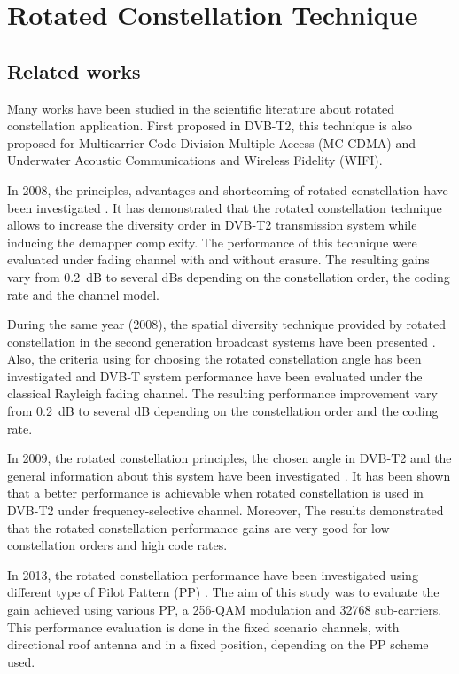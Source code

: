 
\section{Rotated Constellation Technique}

\subsection{Related works}
Many works have been studied in the scientific literature about rotated constellation application. First proposed in DVB-T2, this technique is also proposed for Multicarrier-Code Division Multiple Access (MC-CDMA) and Underwater Acoustic Communications and Wireless Fidelity (WIFI).

In 2008, the principles, advantages and shortcoming of rotated constellation have been investigated \cite{ref6}. It has demonstrated that the rotated constellation technique allows to increase the diversity order in DVB-T2 transmission system while inducing the demapper complexity. The performance of this technique were evaluated under fading channel with and without erasure. The resulting gains vary from 0.2~dB to several dBs depending on the constellation order, the coding rate and the channel model.

During the same year (2008), the spatial diversity technique provided by rotated constellation in the second generation broadcast systems have been presented \cite{ref7}. Also, the criteria using for choosing the rotated constellation angle has been investigated and DVB-T system performance have been evaluated under the classical Rayleigh fading channel. The resulting performance improvement vary from 0.2~dB to several dB depending on the constellation order and the coding rate.

In 2009, the rotated constellation principles, the chosen angle in DVB-T2 and the general information about this system have been investigated \cite{ref8}. It has been shown that a better performance is achievable when rotated constellation is used in DVB-T2 under frequency-selective channel. Moreover, The results demonstrated that the rotated constellation performance gains are very good for low constellation orders and high code rates.

In 2013, the rotated constellation performance have been investigated using different type of Pilot Pattern (PP) \cite{ref9}. The aim of this study was to evaluate the gain achieved using various PP, a 256-QAM modulation and 32768 sub-carriers. This performance evaluation is done in the fixed scenario channels, with directional roof antenna and in a fixed position, depending on the PP scheme used.

